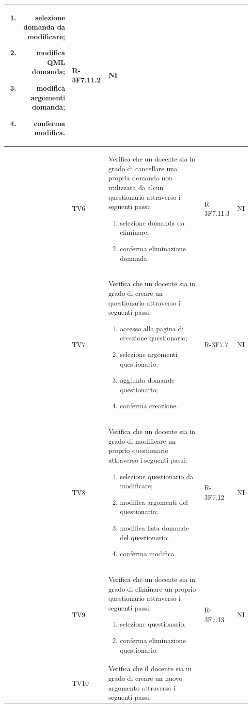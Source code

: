 \documentclass[12pt,a4paper]{article}
\begin{document}
\begin{longtable}{r l p{6cm} l l}
		\begin{enumerate}
			\item selezione domanda da modificare;
			\item modifica QML domanda;
			\item modifica argomenti domanda;
			\item conferma modifica.
		\end{enumerate} & R-3F7.11.2 & NI\tabularnewline
		\midrule
		& TV6 & Verifica che un docente sia in grado di cancellare una propria domanda non utilizzata da alcun questionario attraverso i seguenti passi:
		
		\begin{enumerate}
			\item selezione domanda da eliminare;
			\item conferma eliminazione domanda.
		\end{enumerate} & R-3F7.11.3 & NI\tabularnewline
		\midrule
		& TV7 & Verifica che un docente sia in grado di creare un questionario attraverso i seguenti passi:
		
		\begin{enumerate}
			\item accesso alla pagina di creazione questionario;
			\item selezione argomenti questionario;
			\item aggiunta domande questionario;
			\item conferma creazione.
		\end{enumerate} & R-3F7.7 & NI\tabularnewline
		\midrule
		& TV8 & Verifica che un docente sia in grado di modificare un proprio questionario attraverso i seguenti passi:
		
		\begin{enumerate}
			\item selezione questionario da modificare;
			\item modifica argomenti del questionario;
			\item modifica lista domande del questionario;
			\item conferma modifica.
		\end{enumerate} & R-3F7.12 & NI\tabularnewline
		\midrule
		& TV9 & Verifica che un docente sia in grado di eliminare un proprio questionario attraverso i seguenti passi:
		
		\begin{enumerate}
			\item selezione questionario;
			\item conferma eliminazione questionario.
		\end{enumerate} & R-3F7.13 & NI\tabularnewline
		\midrule
		& TV10 & Verifica che il docente sia in grado di creare un nuovo argomento attraverso i seguenti passi:
		

\end{longtable}
\end{document}
